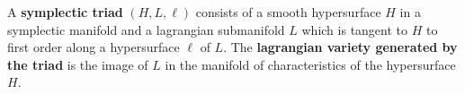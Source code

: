 A \textbf{symplectic triad} $(H, L, \ell)$ consists of a smooth hypersurface $H$ in a symplectic manifold and a lagrangian submanifold $L$ which is tangent to $H$ to first order along a hypersurface $\ell$ of $L$. The \textbf{lagrangian variety generated by the triad} is the image of $L$ in the manifold of characteristics of the hypersurface $H$.
